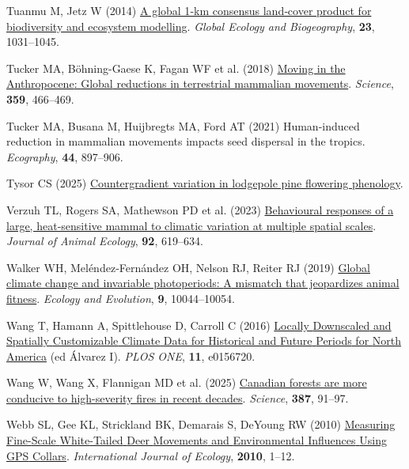 \documentclass[
  12pt,
]{article}
\newlength{\cslhangindent}
\newenvironment{CSLReferences}[2] %
 {\begin{list}{}{%
  \setlength{\itemindent}{0pt}
  \setlength{\leftmargin}{0pt}
  \setlength{\parsep}{0pt}
  \ifodd #1
   \setlength{\leftmargin}{\cslhangindent}
   \setlength{\itemindent}{-1\cslhangindent}
  \fi
  \setlength{\itemsep}{#2\baselineskip}}}
 {\end{list}}
\begin{document}
\begin{CSLReferences}{1}{0}
Tuanmu M, Jetz W (2014) \href{https://doi.org/10.1111/geb.12182}{A global 1‐km consensus land‐cover product for biodiversity and ecosystem modelling}. \emph{Global Ecology and Biogeography}, \textbf{23}, 1031--1045.

Tucker MA, Böhning-Gaese K, Fagan WF et al. (2018) \href{https://doi.org/10.1126/science.aam9712}{Moving in the {Anthropocene}: {Global} reductions in terrestrial mammalian movements}. \emph{Science}, \textbf{359}, 466--469.

Tucker MA, Busana M, Huijbregts MA, Ford AT (2021) Human-induced reduction in mammalian movements impacts seed dispersal in the tropics. \emph{Ecography}, \textbf{44}, 897--906.

Tysor CS (2025) \href{https://doi.org/10.14288/1.0447901}{Countergradient variation in lodgepole pine flowering phenology}.

Verzuh TL, Rogers SA, Mathewson PD et al. (2023) \href{https://doi.org/10.1111/1365-2656.13873}{Behavioural responses of a large, heat‐sensitive mammal to climatic variation at multiple spatial scales}. \emph{Journal of Animal Ecology}, \textbf{92}, 619--634.

Walker WH, Meléndez‐Fernández OH, Nelson RJ, Reiter RJ (2019) \href{https://doi.org/10.1002/ece3.5537}{Global climate change and invariable photoperiods: {A} mismatch that jeopardizes animal fitness}. \emph{Ecology and Evolution}, \textbf{9}, 10044--10054.

Wang T, Hamann A, Spittlehouse D, Carroll C (2016) \href{https://doi.org/10.1371/journal.pone.0156720}{Locally {Downscaled} and {Spatially} {Customizable} {Climate} {Data} for {Historical} and {Future} {Periods} for {North} {America}} (ed Álvarez I). \emph{PLOS ONE}, \textbf{11}, e0156720.

Wang W, Wang X, Flannigan MD et al. (2025) \href{https://doi.org/10.1126/science.ado1006}{Canadian forests are more conducive to high-severity fires in recent decades}. \emph{Science}, \textbf{387}, 91--97.

Webb SL, Gee KL, Strickland BK, Demarais S, DeYoung RW (2010) \href{https://doi.org/10.1155/2010/459610}{Measuring {Fine}-{Scale} {White}-{Tailed} {Deer} {Movements} and {Environmental} {Influences} {Using} {GPS} {Collars}}. \emph{International Journal of Ecology}, \textbf{2010}, 1--12.


\end{CSLReferences}
\end{document}
